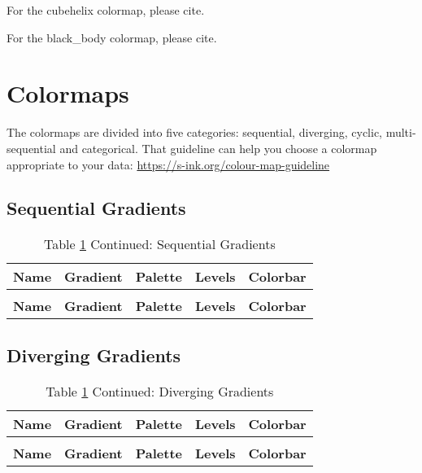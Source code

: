 \documentclass[a4paper]{article}
\begin{document}
For the cubehelix colormap, please cite\cite{green2011colour}.

For the black\_body colormap, please cite\cite{color_advice}.

\newpage
\section{Colormaps}

The colormaps are divided into five categories: sequential, diverging, cyclic, multi-sequential and categorical. That guideline can help you choose a colormap appropriate to your data: \url{https://s-ink.org/colour-map-guideline}

\subsection{Sequential Gradients}
\renewcommand{\arraystretch}{2}
\begin{longtable}{p{}p{}p{}p{}p{}}
	\caption{Sequential Gradients} \label{tab:seq}                                             \\
	\hline
	\textbf{Name} & \textbf{Gradient} & \textbf{Palette} & \textbf{Levels} & \textbf{Colorbar} \\ \hline \endfirsthead
	\caption*{Table \ref{tab:seq} Continued: Sequential Gradients}                             \\
	\hline
	\textbf{Name} & \textbf{Gradient} & \textbf{Palette} & \textbf{Levels} & \textbf{Colorbar} \\ \hline \endhead
	
\end{longtable}
\newpage
\subsection{Diverging Gradients}
\renewcommand{\arraystretch}{2}
\begin{longtable}{p{}p{}p{}p{}p{}}
	\caption{Diverging Gradients} \label{tab:div}                                              \\
	\hline
	\textbf{Name} & \textbf{Gradient} & \textbf{Palette} & \textbf{Levels} & \textbf{Colorbar} \\ \hline \endfirsthead
	\caption*{Table \ref{tab:seq} Continued: Diverging Gradients}                              \\
	\hline
	\textbf{Name} & \textbf{Gradient} & \textbf{Palette} & \textbf{Levels} & \textbf{Colorbar} \\ \hline \endhead
	
\end{longtable}
\newpage
\end{document}
